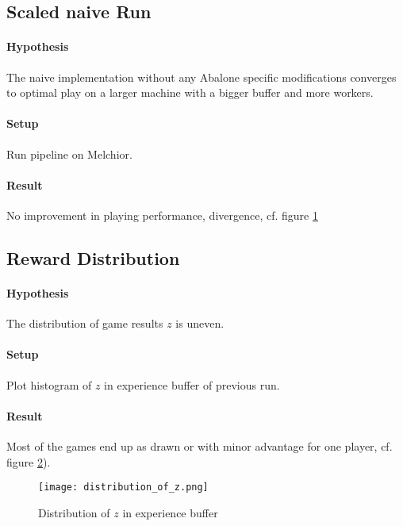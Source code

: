 \subsection{Scaled naive Run}
\paragraph{Hypothesis} The naive implementation without any Abalone specific modifications converges to optimal play on a larger machine with a bigger buffer and more workers.
\paragraph{Setup} Run pipeline on Melchior.
\paragraph{Result} No improvement in playing performance, divergence, cf. figure \ref{performance_remote_naive}
\begin{figure}[!h]
    \centering
    \hfill
    \caption{}
    \label{performance_remote_naive}
\end{figure}

\subsection{Reward Distribution}
\paragraph{Hypothesis} The distribution of game results $z$ is uneven.
\paragraph{Setup} Plot histogram of $z$ in experience buffer of previous run.
\paragraph{Result} Most of the games end up as drawn or with minor advantage for one player, cf. figure \ref{distribution_of_rewards}).

\begin{figure}[!h]
    \centering
    \texttt{[image: distribution\_of\_z.png]}
    \caption{Distribution of $z$ in experience buffer}
    \label{distribution_of_rewards}
\end{figure}

